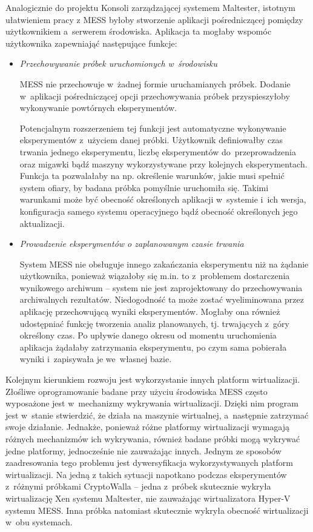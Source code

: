 \documentclass[a4paper,12pt,oneside]{article}
\begin{document}
	Analogicznie do projektu Konsoli zarządzającej systemem Maltester, istotnym ułatwieniem pracy z MESS byłoby stworzenie aplikacji pośredniczącej pomiędzy użytkownikiem a~serwerem środowiska. Aplikacja ta mogłaby wspomóc użytkownika zapewniająć następujące funkcje:
	\begin{itemize}
		\item \textit{Przechowywanie próbek uruchomionych w~środowisku}
		
		MESS nie przechowuje w~żadnej formie uruchamianych próbek. Dodanie w~aplikacji pośredniczącej opcji przechowywania próbek przyspieszyłoby wykonywanie powtórnych eksperymentów.
		
		Potencjalnym rozszerzeniem tej funkcji jest automatyczne wykonywanie eksperymentów z~użyciem danej próbki. Użytkownik definiowałby czas trwania jednego eksperymentu, liczbę eksperymentów do~przeprowadzenia oraz migawki bądź maszyny wykorzystywane przy kolejnych eksperymentach. Funkcja ta pozwalałaby na np. określenie warunków, jakie musi spełnić system ofiary, by badana próbka pomyślnie uruchomiła się. Takimi warunkami może być obecność określonych aplikacji w~systemie i~ich wersja, konfiguracja samego systemu operacyjnego bądź obecność określonych jego aktualizacji.
		
		\item \textit{Prowadzenie eksperymentów o zaplanowanym czasie trwania}
		
		System MESS nie obsługuje innego zakańczania eksperymentu niż na żądanie użytkownika, ponieważ wiązałoby się m.in. to z~problemem dostarczenia wynikowego archiwum -- system nie jest zaprojektowany do przechowywania archiwalnych rezultatów. Niedogodność ta może zostać wyeliminowana przez aplikację przechowującą wyniki eksperymentów. Mogłaby ona również udostępniać funkcję tworzenia analiz planowanych, tj. trwających z~góry określony czas. Po upływie danego okresu od momentu uruchomienia aplikacja żądałaby zatrzymania eksperymentu, po czym sama pobierała wyniki i~zapisywała je we~własnej bazie.
	\end{itemize}
		
	Kolejnym kierunkiem rozwoju jest wykorzystanie innych platform wirtualizacji.
	Złośliwe oprogramowanie badane przy użyciu środowiska MESS często wyposażone jest w~mechanizmy wykrywania wirtualizacji. Dzięki nim program jest w~stanie stwierdzić, że działa na maszynie wirtualnej, a~następnie zatrzymać swoje działanie. Jednakże, ponieważ różne platformy wirtualizacji wymagają różnych mechanizmów ich wykrywania, również badane próbki mogą wykrywać jedne platformy, jednocześnie nie zauważając innych. Jednym ze sposobów zaadresowania tego problemu jest dywersyfikacja wykorzystywanych platform wirtualizacji. Na jedną z takich sytuacji napotkano podczas eksperymentów z~różnymi próbkami CryptoWalla -- jedna z~próbek skutecznie wykryła wirtualizację Xen systemu Maltester, nie zauważając wirtualizatora Hyper-V systemu MESS. Inna próbka natomiast skutecznie wykryła obecność wirtualizacji w~obu systemach.
	
\end{document}
